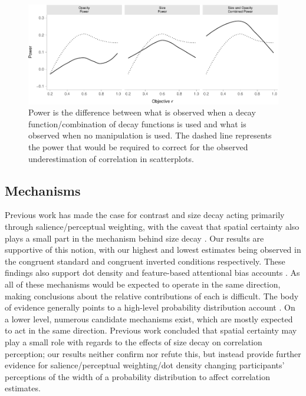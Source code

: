 \documentclass[manuscript, review, anonymous, screen]{acmart}
\begin{document}
\begin{figure}

{\centering \includegraphics[width=1\textwidth,height=\textheight]{size_and_opacity_files/figure-pdf/fig-power-plot-1.pdf}

}

\caption{\label{fig-power-plot}Power is the difference between what is
observed when a decay function/combination of decay functions is used
and what is observed when no manipulation is used. The dashed line
represents the power that would be required to correct for the observed
underestimation of correlation in scatterplots.}

\end{figure}

\hypertarget{sec-mechs}{%
\subsection{Mechanisms}\label{sec-mechs}}

Previous work has made the case for contrast and size decay acting
primarily through salience/perceptual weighting, with the caveat that
spatial certainty also plays a small part in the mechanism behind size
decay \citep{strain_2023, strain_2023b}. Our results are supportive of
this notion, with our highest and lowest estimates being observed in the
congruent standard and congruent inverted conditions respectively. These
findings also support dot density \citep{yang_2023} and feature-based
attentional bias accounts \citep{hong_2021, sun_2016}. As all of these
mechanisms would be expected to operate in the same direction, making
conclusions about the relative contributions of each is difficult. The
body of evidence generally points to a high-level probability
distribution account \citep{rensink_2017, rensink_2022}. On a lower
level, numerous candidate mechanisms exist, which are mostly expected to
act in the same direction. Previous work concluded that spatial
certainty \citep{strain_2023b} may play a small role with regards to the
effects of size decay on correlation perception; our results neither
confirm nor refute this, but instead provide further evidence for
salience/perceptual weighting/dot density changing participants'
perceptions of the width of a probability distribution to affect
correlation estimates.
\end{document}
